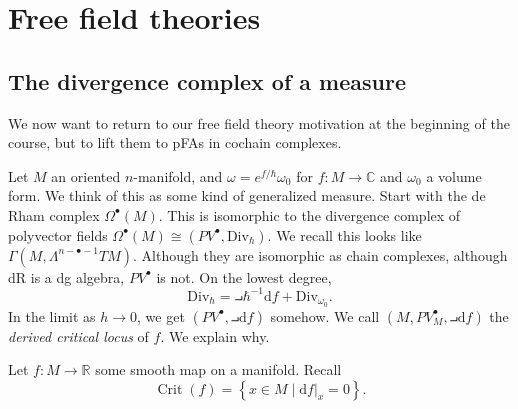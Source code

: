 \chapter{Free field theories}

\section{The divergence complex of a measure}


We now want to return to our free field theory motivation at the beginning of the course, but to lift them to pFAs in cochain complexes.

Let $M$ an oriented $n$-manifold, and $\omega =e^{f/\hbar} \omega _0$ for $f : M \to \mathbb{C} $ and $\omega _0$ a volume form. We think of this as some kind of generalized measure. Start with the de Rham complex $\Omega ^{\bullet} (M)$. This is isomorphic to the divergence complex of polyvector fields $\Omega ^{\bullet} (M) \cong (PV^{\bullet} ,\mathrm{Div}_\hbar)$. We recall this looks like $\Gamma(M,\Lambda ^{n-\bullet-1} TM)$. Although they are isomorphic as chain complexes, although dR is a dg algebra, $PV^{\bullet} $ is not. On the lowest degree,
\[
	\mathrm{Div}_{\hbar } = \intprod \hbar ^{-1} \mathrm{d} f + \mathrm{Div} _{\omega _0} 
.\]
In the limit as $h\to 0$, we get $(PV^{\bullet} ,\intprod\mathrm{d} f)$ somehow.
We call $(M,PV^{\bullet}_M,\intprod\mathrm{d} f)$ the \emph{derived critical locus} of $f$. We explain why.

Let $f : M \to \mathbb{R} $ some smooth map on a manifold. Recall
\[
	\operatorname{Crit} (f) = \left\{ x\in M\mid \mathrm{d} f|_x=0 \right\} 
.\]

